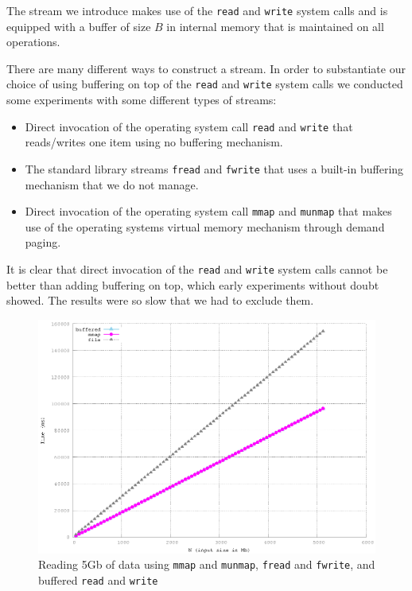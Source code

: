 \documentclass[twoside,11pt,openright]{report}
\begin{document}
The stream we introduce makes use of the \texttt{read} and \texttt{write} system calls and is equipped with a buffer of size $B$ in internal memory that is maintained on all operations.

There are many different ways to construct a stream. In order to substantiate our choice of using buffering on top of the \texttt{read} and \texttt{write} system calls we conducted some experiments with some different types of streams:

\begin{itemize}
	\item Direct invocation of the operating system call \texttt{read} and \texttt{write} that reads/writes one item using no buffering mechanism.
	\item The standard library streams \texttt{fread} and \texttt{fwrite} that uses a built-in buffering mechanism that we do not manage.
	\item Direct invocation of the operating system call \texttt{mmap} and \texttt{munmap} that makes use of the operating systems virtual memory mechanism through demand paging.
\end{itemize}

It is clear that direct invocation of the \texttt{read} and \texttt{write} system calls cannot be better than adding buffering on top, which early experiments without doubt showed. The results were so slow that we had to exclude them.

\begin{figure}
  \centering
  \includegraphics[width=\linewidth]{../src/experiments/stream_input_speed_experiment_results/2016-04-23.16_00_16/timems}
  \caption{Reading 5Gb of data using \texttt{mmap} and \texttt{munmap}, \texttt{fread} and \texttt{fwrite}, and buffered \texttt{read} and \texttt{write}}
  \label{fig:stream_input_speed}
\end{figure}
\end{document}
